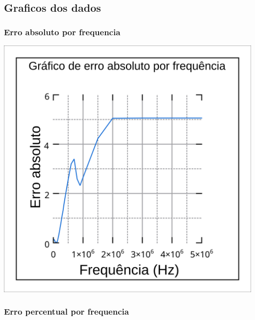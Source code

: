 \documentclass[12pt,twoside, a4paper, twocolumn]{article}
\begin{document}
\subsection{Graficos dos dados}

\subsubsection{Erro absoluto por frequencia}

\begin{adjustbox}{scale=0.30}
    \includegraphics{Grafico1.png}
\end{adjustbox}

\subsubsection{Erro percentual por frequencia}
\end{document}
